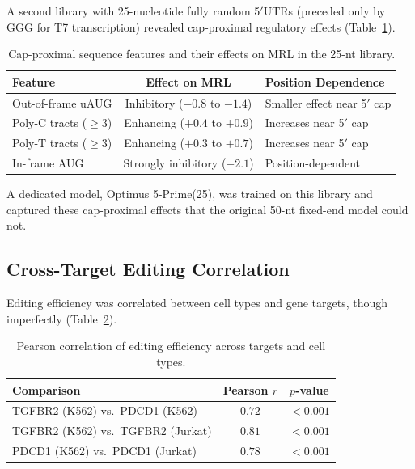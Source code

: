 \documentclass[11pt]{article}
\begin{document}
A second library with 25-nucleotide fully random 5$'$UTRs (preceded only by GGG for T7 transcription) revealed cap-proximal regulatory effects (Table~\ref{tab:cap_effects}).

\begin{table}[H]
\centering
\caption{Cap-proximal sequence features and their effects on MRL in the 25-nt library.}
\label{tab:cap_effects}
\begin{tabular}{@{}lcl@{}}
\toprule
Feature & Effect on MRL & Position Dependence \\
\midrule
Out-of-frame uAUG & Inhibitory ($-0.8$ to $-1.4$) & Smaller effect near 5$'$ cap \\
Poly-C tracts ($\geq 3$) & Enhancing ($+0.4$ to $+0.9$) & Increases near 5$'$ cap \\
Poly-T tracts ($\geq 3$) & Enhancing ($+0.3$ to $+0.7$) & Increases near 5$'$ cap \\
In-frame AUG & Strongly inhibitory ($-2.1$) & Position-dependent \\
\bottomrule
\end{tabular}
\end{table}

A dedicated model, Optimus 5-Prime(25), was trained on this library and captured these cap-proximal effects that the original 50-nt fixed-end model could not.

\subsection{Cross-Target Editing Correlation}

Editing efficiency was correlated between cell types and gene targets, though imperfectly (Table~\ref{tab:correlation}).

\begin{table}[H]
\centering
\caption{Pearson correlation of editing efficiency across targets and cell types.}
\label{tab:correlation}
\begin{tabular}{@{}lcc@{}}
\toprule
Comparison & Pearson $r$ & $p$-value \\
\midrule
TGFBR2 (K562) vs.\ PDCD1 (K562) & $0.72$ & $< 0.001$ \\
TGFBR2 (K562) vs.\ TGFBR2 (Jurkat) & $0.81$ & $< 0.001$ \\
PDCD1 (K562) vs.\ PDCD1 (Jurkat) & $0.78$ & $< 0.001$ \\
\bottomrule
\end{tabular}
\end{table}
\end{document}
